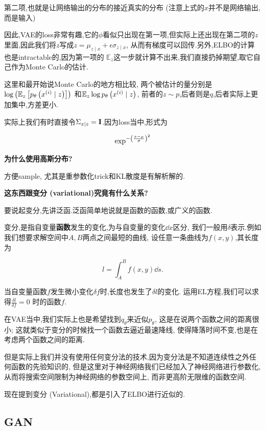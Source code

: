 	第二项,也就是让网络输出的分布的接近真实的分布
	(注意上式的$x$并不是网络输出,而是输入)
	
	因此,VAE的loss非常有趣,它的$\phi$看似只出现在第一项,但实际上还出现在第二项的$z$
	里面,因此我们将$z$写成$z=\mu_{z \mid x}+\epsilon \sigma_{z \mid x}$,
	从而有梯度可以回传.另外,ELBO的计算也是intractable的,因为第一项的
	$\mathbb{E}_{z}$这一步就计算不出来,我们直接扔掉期望,取它自己作为Monte Carlo的估计.
	
	这里和最开始说Monte Carlo的地方相比较,
	两个被估计的量分别是$\log\left( \mathbb{E}_z \left[ p_{\theta} \left( x^{(i)}  \mid z\right)\right]\right)$
	和$\mathbb{E}_{z} \log p_{\theta} \left( x^{(i)}\mid z\right)$,
	前者的$z \sim p$,后者则是$q$,后者实际上更加集中,方差更小.
	
	实际上我们有时直接令$\Sigma_{x \mid z} = \bold{I}$.因为loss当中,形式为

	\begin{equation}
		\exp^{-\left( \frac{x - \mu}{\sigma}\right)^2}
	\end{equation}

	\textbf{为什么使用高斯分布?}
	
	方便sample, 尤其是重参数化trick和KL散度是有解析解的.
	
	\textbf{这东西跟变分 (variational)究竟有什么关系?}
	
	要说起变分,先讲泛函.泛函简单地说就是函数的函数,或广义的函数.

	变分,是指自变量\textbf{函数}发生的变化,为与自变量的变化$\dd x$区分,
	我们一般用$\delta$表示.例如我们想要求解空间中$A, B$两点之间最短的曲线,
	设任意一条曲线为$f(x, y)$,其长度为

	\begin{equation}
		l = \int_{A}^{B} f(x,  y) \dd s.
	\end{equation}

	当自变量函数$f$发生微小变化$\delta f$时,长度也发生了$\delta l$的变化.
	运用EL方程,我们可以求得$\frac{\delta l}{\delta f} = 0$
	时的函数$f$.
	
	在VAE当中,我们实际上也是希望找到$q_\theta$来近似$p_{\theta}$,
	这是在说两个函数之间的距离很小;
	这就类似于变分的时候找一个函数去逼近最速降线,
	使得降落时间不变,也是在考虑两个函数之间的距离.

	但是实际上我们并没有使用任何变分法的技术,因为变分法是不知道连续性之外任何函数的先验知识的,
	但是这里对于神经网络我们已经加入了神经网络进行参数化,从而将搜索空间限制为神经网络的参数空间上,
	而非更高阶无限维的函数空间.

	现在提到变分 (Variational),都是引入了ELBO进行近似的.

	\subsection{GAN}

